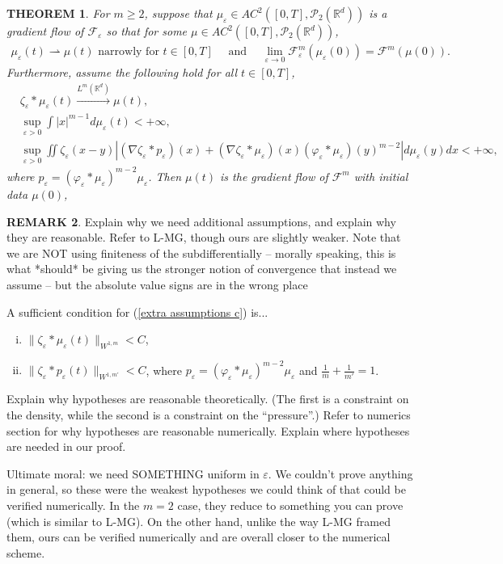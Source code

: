 \documentclass[11pt,leqno]{amsart}
\newtheorem{thm}{THEOREM}[section]
\theoremstyle{definition}
\newtheorem{remark}[thm]{REMARK}
\newcommand{\R}{{\mathord{\mathbb R}}}
\newcommand{\Rd}{{\mathord{\mathbb R}^d}}
\newcommand{\wto}{\rightharpoonup}
\newcommand{\F}{\mathcal{F}}
\def\P{{\mathcal P}}
\def\e{\varepsilon}
\def\F{\mathcal{F}}
\begin{document}
\begin{thm}
For $m \geq 2$, suppose that $\mu_\e \in AC^2([0,T],\P_2(\R^d))$ is a gradient flow of $\F_\e$ so that for some $\mu \in AC^2([0,T],\P_2(\R^d))$,
\begin{align}   \mu_\e(t) \wto \mu(t) \text{ narrowly for }t \in [0,T] \quad \text{ and } \quad
 \lim_{\e \to 0} \F^m_\e(\mu_\e(0)) = \F^m(\mu(0)) .
\end{align}
Furthermore, assume the following hold for all $t \in [0,T]$,
\begin{align} \label{extra assumptions a}
 &\zeta_\e*\mu_\e(t) \xrightarrow{L^m(\Rd)} \mu(t) , \\
 &\sup_{\e >0} \int |x|^{m-1}d \mu_\e(t) <+\infty ,  \label{extra assumptions b}\\
 &\sup_{\e >0} \iint  \zeta_\e(x-y) \left| (\nabla \zeta_\e * p_\e)(x)  + (\nabla \zeta_\e * \mu_\e) (x) (\varphi_\e*\mu_\e)(y)^{m-2} \right|d\mu_\e(y) dx < +\infty , \label{extra assumptions c}
\end{align}
where $p_\e = (\varphi_\e *\mu_\e)^{m-2} \mu_\e$. Then $\mu(t)$ is the gradient flow of $\mathcal{F}^m$ with initial data $\mu(0)$, 
\end{thm}

\begin{remark} \label{justifyassumptions}
{\color{Aquamarine}  Explain why we need additional assumptions, and explain why they are reasonable. Refer to L-MG, though ours are slightly weaker.} {\color{Aquamarine} Note that we are NOT using finiteness of the subdifferentially -- morally speaking, this is what *should* be giving us the stronger notion of convergence that instead we assume -- but the absolute value signs are in the wrong place }

{\color{Aquamarine} A sufficient condition for (\ref{extra assumptions c}) is...
\begin{enumerate}[(i)]
\item $\|\zeta_\e*\mu_\e(t) \|_{W^{1,m}} < C$, \label{H1i}
\item $\|\zeta_\e*p_\e(t) \|_{W^{1,m'}} < C $, where $p_\e = (\varphi_\e *\mu_\e)^{m-2} \mu_\e$ and $\frac{1}{m} + \frac{1}{m'} = 1$.
\end{enumerate}
 Explain why hypotheses are reasonable theoretically. (The first is a constraint on the density, while the second is a constraint on the ``pressure''.) Refer to numerics section for why hypotheses are reasonable numerically. Explain where hypotheses are needed in our proof. 

Ultimate moral: we need SOMETHING uniform in $\e$. We couldn't prove anything in general, so these were the weakest hypotheses we could think of that could be verified numerically. In the $m=2$ case, they reduce to something you can prove (which is similar to L-MG). On the other hand, unlike the way L-MG framed them, ours can be verified numerically and are overall closer to the numerical scheme.}
\end{remark}
\end{document}
